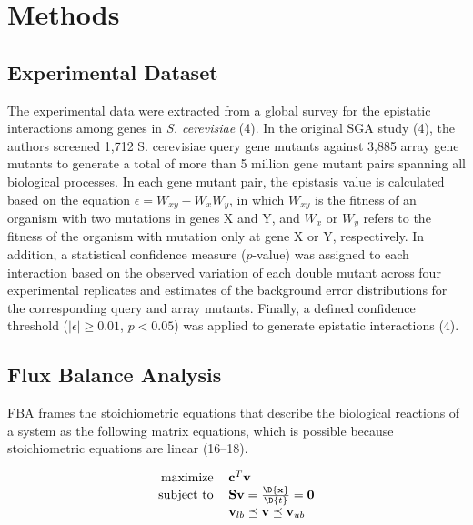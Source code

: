 \section{Methods}
\subsection{Experimental Dataset}
The experimental data were extracted from a global survey for the
epistatic interactions among genes in \textit{S. cerevisiae} (4). In
the original SGA study (4), the authors screened 1,712 S. cerevisiae
query gene mutants against 3,885 array gene mutants to generate a
total of more than 5 million gene mutant pairs spanning all biological
processes. In each gene mutant pair, the epistasis value is calculated
based on the equation $\epsilon = W_{xy} − W_xW_y$, in which $W_{xy}$
is the fitness of an organism with two mutations in genes X and Y, and
$W_x$ or $W_y$ refers to the fitness of the organism with mutation
only at gene X or Y, respectively. In addition, a statistical
confidence measure ($p$-value) was assigned to each interaction based on
the observed variation of each double mutant across four experimental
replicates and estimates of the background error distributions for the
corresponding query and array mutants. Finally, a defined confidence
threshold ($\left|\epsilon\right| \geq 0.01$, $p < 0.05$) was applied
to generate epistatic interactions (4).

\subsection{Flux Balance Analysis}

FBA frames the stoichiometric equations that describe the biological
reactions of a system as the following matrix equations, which is
possible because stoichiometric equations are linear (16--18).

\begin{equation}
\centering
\begin{tabular}{rl}
maximize   & $\mathbf{c}^T\mathbf{v}$                                     \\
subject to & $\mathbf{S v} = \frac{\D{\mathbf{x}}}{\D{t}} = \mathbf{0}$   \\
           & $\mathbf{v}_{lb} \preceq \mathbf{v} \preceq \mathbf{v}_{ub}$ \\
\end{tabular}
\end{equation}

